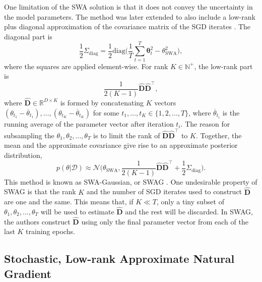 \documentclass[msc,deptreport.inf]{infthesis} %
\newcommand{\matr}[1]{\mathbf{#1}}
\newcommand{\bgreek}[1]{\boldsymbol{#1}}
\newcommand{\R}{\mathbb R}
\newcommand{\N}{\mathbb N}
\begin{document}
One limitation of the SWA solution is that it does not convey the uncertainty in the model parameters. The method was later extended to also include a low-rank plus diagonal approximation of the covariance matrix of the SGD iterates \cite{maddox2019}. The diagonal part is
\begin{equation}
	\frac{1}{2}\Sigma_\text{diag} = \frac{1}{2} \text{diag}\Bigg(\frac{1}{T}\sum_{t=1}^T \bgreek{\theta}_t^2 - \theta_{\text{SWA}}^2 \Bigg),
\end{equation}
where the squares are applied element-wise. For rank $K \in \N^+$, the low-rank part is
\begin{equation}
	\frac{1}{2(K-1)} \hat{\matr{D}}\hat{\matr{D}}^\intercal,
\end{equation}
where $\hat{\matr{D}} \in \R^{D \times K}$ is formed by concatenating $K$ vectors $(\theta_{t_1} - \overline{\theta}_{t_1}), \dots, (\theta_{t_K} - \overline{\theta}_{t_K})$ for some $t_1, \dots, t_K \in \{1,2, \dots, T\}$, where $\overline{\theta}_{t_i}$ is the running average of the parameter vector after iteration $t_i$. The reason for subsampling the $\theta_1, \theta_2, \dots, \theta_T$ is to limit the rank of $\hat{\matr{D}}\hat{\matr{D}}^\intercal$ to $K$. 
Together, the mean and the approximate covariance give rise to an approximate posterior distribution, 
\begin{equation}\label{eqn:swag_dist}
	p(\theta | \mathcal{D}) \approx 
	\mathcal{N}\Big(\theta_\text{SWA}, \frac{1}{2(K-1)} \hat{\matr{D}}\hat{\matr{D}}^\intercal + \frac{1}{2}\Sigma_\text{diag}\Big).
\end{equation}
This method is known as SWA-Gaussian, or SWAG \cite{maddox2019}. One undesirable property of SWAG is that the rank $K$ and the number of SGD iterates used to construct $\hat{\matr{D}}$ are one and the same. This means that, if $K \ll T$, only a tiny subset of $\theta_1, \theta_2, \dots, \theta_T$ will be used to estimate $\hat{\matr{D}}$ and the rest will be discarded. In SWAG, the authors construct $\hat{\matr{D}}$ using only the final parameter vector from each of the last $K$ training epochs. 


\subsection{Stochastic, Low-rank Approximate Natural Gradient}\label{sec:slang}
\end{document}
